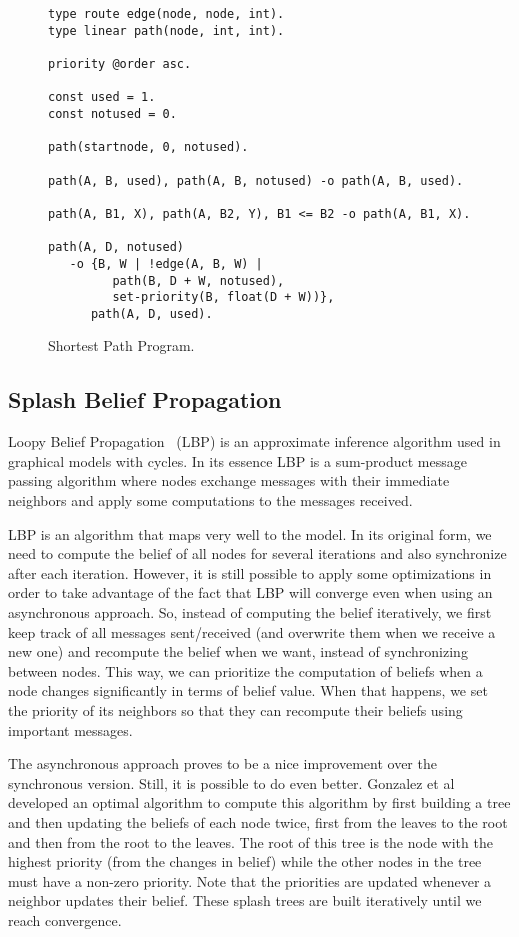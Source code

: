 \begin{figure}[h!]
\small\begin{verbatim}
type route edge(node, node, int).
type linear path(node, int, int).

priority @order asc.

const used = 1.
const notused = 0.

path(startnode, 0, notused).

path(A, B, used), path(A, B, notused) -o path(A, B, used).

path(A, B1, X), path(A, B2, Y), B1 <= B2 -o path(A, B1, X).

path(A, D, notused)
   -o {B, W | !edge(A, B, W) |
         path(B, D + W, notused),
         set-priority(B, float(D + W))},
      path(A, D, used).
\end{verbatim}
  \caption{Shortest Path Program.}
  \label{code:shortest_path_program}
\end{figure}
\normalsize

\subsection{Splash Belief Propagation}

Loopy Belief Propagation~\cite{Murphy99loopybelief} (LBP) is an approximate inference algorithm
used in graphical models with cycles. In its essence LBP is a sum-product message passing algorithm
where nodes exchange messages with their immediate neighbors and apply some computations to the messages
received.

LBP is an algorithm that maps very well to the \lang model. In its original form, we need to compute
the belief of all nodes for several iterations and also synchronize after each iteration.
However, it is still possible to apply
some optimizations in order to take advantage of the fact that LBP will converge even when using
an asynchronous approach. So, instead of computing the belief iteratively,
we first keep track of all messages sent/received (and overwrite them when we receive a new one)
and recompute the belief when we want, instead of synchronizing between nodes.
This way, we can prioritize the computation of beliefs when
a node changes significantly in terms of belief value. When that happens, we set the priority of its
neighbors so that they can recompute their beliefs using important messages.

The asynchronous approach proves to be a nice improvement over the synchronous version. Still, it
is possible to do even better. Gonzalez et al~\cite{Gonzalez+al:aistats09paraml} developed an optimal
algorithm to compute this algorithm by first building a tree and then updating the beliefs of each node twice, first from the leaves to the root and then from the root to the leaves. The root of this tree
is the node with the highest priority (from the changes in belief) while the other nodes in the tree
must have a non-zero priority. Note that the priorities are updated whenever a neighbor updates
their belief. These splash trees are built iteratively until we reach convergence.

